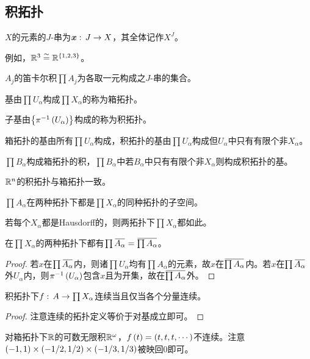 \documentclass{ctexrep}
\begin{document}
  \subsection{积拓扑}
  \begin{definition}
    $X$的元素的$J$-串为$\boldsymbol{x}:\, J \rightarrow X$，其全体记作$X^J$。
  \end{definition}
  例如，$\mathbb{R}^3\overset{\sim}{=} \mathbb{R}^{\left\{1,2,3\right\}}$。
  \begin{definition}
    $A_j$的笛卡尔积$\prod A_j$为各取一元构成之$J$-串的集合。
  \end{definition}
  \begin{definition}
    基由$\prod U_\alpha$构成$\prod X_\alpha$的称为箱拓扑。
  \end{definition}
  \begin{definition}
    子基由$\left\{\pi^{-1}\left(U_{\alpha}\right)\right\}$构成的称为积拓扑。
  \end{definition}
  \begin{theorem}
    箱拓扑的基由所有$\prod U_\alpha$构成，积拓扑的基由$\prod U_\alpha$构成但$U_\alpha$中只有有限个非$X_\alpha$。
  \end{theorem}
  \begin{theorem}
    $\prod B_\alpha$构成箱拓扑的积，$\prod B_\alpha$中若$B_\alpha$中只有有限个非$X_\alpha$则构成积拓扑的基。
  \end{theorem}
  \begin{ex}
    $\mathbb{R}^n$的积拓扑与箱拓扑一致。
  \end{ex}
  \begin{theorem}
    $\prod A_\alpha$在两种拓扑下都是$\prod X_\alpha$的同种拓扑的子空间。
  \end{theorem}
  \begin{theorem}
    若每个$X_\alpha$都是Hausdorff的，则两拓扑下$\prod X_\alpha$都如此。
  \end{theorem}
  \begin{theorem}
    在$\prod X_\alpha$的两种拓扑下都有$\prod \clo{A_\alpha} = \clo{\prod A_\alpha}$。
  \end{theorem}
  \begin{proof}
    若$x$在$\prod \clo{A_\alpha}$内，则诸$\prod U_\alpha$均有$\prod A_\alpha$的元素，故$x$在$\clo{\prod A_\alpha}$内。若$x$在$\prod \clo{A_\alpha}$外$U_\alpha$内，则$\pi^{-1}\left(U_\alpha\right)$包含$x$且为开集，故在$\clo{\prod A_\alpha}$外。
  \end{proof}
  \begin{theorem}
    积拓扑下$f:\, A \rightarrow \prod X_\alpha$连续当且仅当各个分量连续。
  \end{theorem}
  \begin{proof}
    注意连续的拓扑定义等价于对基成立即可。
  \end{proof}  
  \begin{ex}
    对箱拓扑下$\mathbb{R}$的可数无限积$\mathbb{R}^\omega$，$f\left(t\right)=\left(t,t,t,\cdots\right)$不连续。注意$\left(-1,1\right)\times\left(-1/2,1/2\right)\times\left(-1/3,1/3\right)$被映回$0$即可。
  \end{ex}
\end{document}
